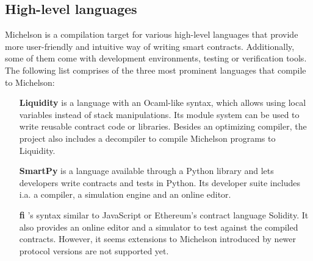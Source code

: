 \subsection{High-level languages}
Michelson is a compilation target for various high-level languages that provide more user-friendly and intuitive way of writing smart contracts. Additionally, some of them come with development environments, testing or verification tools. The following list comprises of the three most prominent languages that compile to Michelson:

\begin{itemize}
\item[\textbf{Liquidity}] is a language with an Ocaml-like syntax, which allows using local variables instead of stack manipulations. Its module system can be used to write reusable contract code or libraries. Besides an optimizing compiler, the project also includes a decompiler to compile Michelson programs to Liquidity. \cite{liquidity}
\item[\textbf{SmartPy}] is a language available through a Python library and lets developers write contracts and tests in Python. Its developer suite includes i.a. a compiler, a simulation engine and an online editor. \cite{smartpy}
\item [\textbf{fi}] 's syntax similar to JavaScript or Ethereum's contract language Solidity. It also provides an online editor and a simulator to test against the compiled contracts. However, it seems extensions to Michelson introduced by newer protocol versions are not supported yet. \cite{https://fi-code.com/}
\end{itemize}